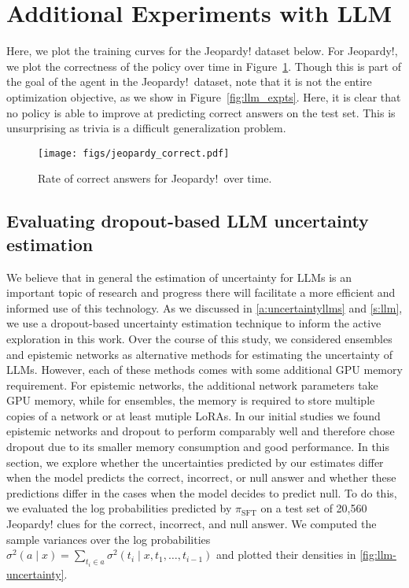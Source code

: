\documentclass{article} \usepackage{iclr2023_conference,times}
\newcommand{\sftpolicy}{\pi_{\text{SFT}}}
\newcommand{\add}[1]{#1}
\begin{document}
\section{Additional Experiments with LLM}
\label{a:dpo_additional_expts}
Here, we plot the training curves for the Jeopardy! dataset below.
For Jeopardy!, we plot the correctness of the policy over time in Figure~\ref{fig:jeopardy_correct}.
Though this is part of the goal of the agent in the Jeopardy!\ dataset, note that it is not the entire optimization objective, as we show in Figure~\ref{fig:llm_expts}. Here, it is clear that no policy is able to improve at predicting correct answers on the test set. This is unsurprising as trivia is a difficult generalization problem.
\begin{figure}
    \centering
    \texttt{[image: figs/jeopardy\_correct.pdf]}
    \caption{Rate of correct answers for Jeopardy!\ over time.}
    \label{fig:jeopardy_correct}
\end{figure}
\add{
\subsection{Evaluating dropout-based LLM uncertainty estimation}
}
\label{s:uncertainty}

We believe that in general the estimation of uncertainty for LLMs is an important topic of research and progress there will facilitate a more efficient and informed use of this technology. As we discussed in \cref{a:uncertaintyllms} and \cref{s:llm}, we use a dropout-based uncertainty estimation technique to inform the active exploration in this work. Over the course of this study, we considered ensembles and epistemic networks \citep{osband2022fine} as alternative methods for estimating the uncertainty of LLMs. However, each of these methods comes with some additional GPU memory requirement. For epistemic networks, the additional network parameters take GPU memory, while for ensembles, the memory is required to store multiple copies of a network or at least mutiple LoRAs. In our initial studies we found epistemic networks and dropout to perform comparably well and therefore chose dropout due to its smaller memory consumption and good performance.
In this section, we explore whether the uncertainties predicted by our estimates differ when the model predicts the correct, incorrect, or null answer and whether these predictions differ in the cases when the model decides to predict null. 
To do this, we evaluated the log probabilities predicted by $\sftpolicy$ on a test set of 20,560 Jeopardy! clues for the correct, incorrect, and null answer. 
We computed the sample variances over the log probabilities $\sigma^2(a\mid x) = \sum_{t_i \in a} \sigma^2(t_i\mid x, t_1, \dots, t_{i - 1})$
and plotted their densities in \cref{fig:llm-uncertainty}.
\end{document}

